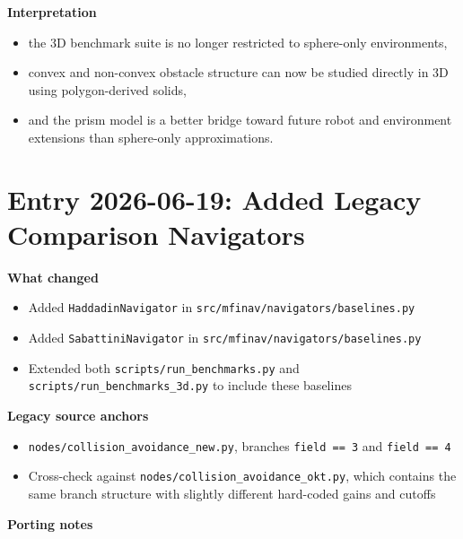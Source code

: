 \documentclass[11pt]{article}
\begin{document}
\textbf{Interpretation}

\begin{itemize}[leftmargin=*]
  \item the 3D benchmark suite is no longer restricted to sphere-only environments,
  \item convex and non-convex obstacle structure can now be studied directly in 3D using polygon-derived solids,
  \item and the prism model is a better bridge toward future robot and environment extensions than sphere-only approximations.
\end{itemize}

\section*{Entry 2026-06-19: Added Legacy Comparison Navigators}

\textbf{What changed}

\begin{itemize}[leftmargin=*]
  \item Added \texttt{HaddadinNavigator} in \texttt{src/mfinav/navigators/baselines.py}
  \item Added \texttt{SabattiniNavigator} in \texttt{src/mfinav/navigators/baselines.py}
  \item Extended both \texttt{scripts/run\_benchmarks.py} and \texttt{scripts/run\_benchmarks\_3d.py} to include these baselines
\end{itemize}

\textbf{Legacy source anchors}

\begin{itemize}[leftmargin=*]
  \item \texttt{nodes/collision\_avoidance\_new.py}, branches \texttt{field == 3} and \texttt{field == 4}
  \item Cross-check against \texttt{nodes/collision\_avoidance\_okt.py}, which contains the same branch structure with slightly different hard-coded gains and cutoffs
\end{itemize}

\textbf{Porting notes}
\end{document}
